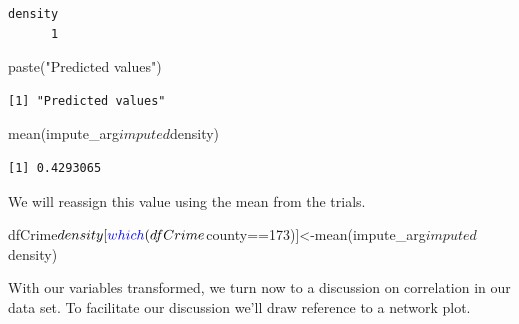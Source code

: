 \documentclass[]{article}
\newenvironment{Shaded}{}{}
\newcommand{\DecValTok}[1]{#1}
\newcommand{\KeywordTok}[1]{\textcolor[rgb]{0.00,0.00,1.00}{#1}}
\newcommand{\NormalTok}[1]{#1}
\newcommand{\OperatorTok}[1]{#1}
\newcommand{\StringTok}[1]{\textcolor[rgb]{0.00,0.50,0.50}{#1}}
\begin{document}
\begin{verbatim}
density 
      1 
\end{verbatim}

\begin{Shaded}
\begin{Highlighting}[]
\KeywordTok{paste}\NormalTok{(}\StringTok{"Predicted values"}\NormalTok{)}
\end{Highlighting}
\end{Shaded}

\begin{verbatim}
[1] "Predicted values"
\end{verbatim}

\begin{Shaded}
\begin{Highlighting}[]
\KeywordTok{mean}\NormalTok{(impute_arg}\OperatorTok{$}\NormalTok{imputed}\OperatorTok{$}\NormalTok{density)}
\end{Highlighting}
\end{Shaded}

\begin{verbatim}
[1] 0.4293065
\end{verbatim}

We will reassign this value using the mean from the trials.

\begin{Shaded}
\begin{Highlighting}[]
\NormalTok{dfCrime}\OperatorTok{$}\NormalTok{density[}\KeywordTok{which}\NormalTok{(dfCrime}\OperatorTok{$}\NormalTok{county}\OperatorTok{==}\DecValTok{173}\NormalTok{)]<-}\KeywordTok{mean}\NormalTok{(impute_arg}\OperatorTok{$}\NormalTok{imputed}\OperatorTok{$}\NormalTok{density)}
\end{Highlighting}
\end{Shaded}

With our variables transformed, we turn now to a discussion on
correlation in our data set. To facilitate our discussion we'll draw
reference to a network plot.
\end{document}
